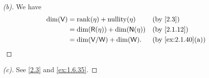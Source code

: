 \begin{proof}[(b)]
  We have
  \begin{align*}
    \dim(\V) & = \rk{\eta} + \nt{\eta}             &  & \text{(by \cref{2.3})}          \\
             & = \dim(\rg{\eta}) + \dim(\ns{\eta}) &  & \text{(by \cref{2.1.12})}       \\
             & = \dim(\V / \W) + \dim(\W).         &  & \text{(by \cref{ex:2.1.40}(a))}
  \end{align*}
\end{proof}

\begin{proof}[(c)]
  See \cref{2.3} and \cref{ex:1.6.35}.
\end{proof}

